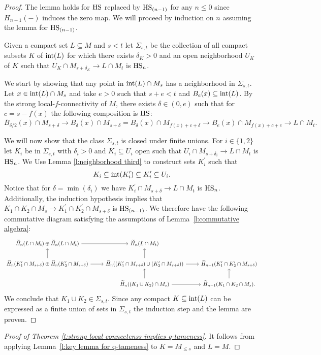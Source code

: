 \begin{proof}
	The lemma holds for $\mathrm{HS}$ replaced by $\mathrm{HS}_{(n-1)}$ for any $n \leq 0$ since $H_{n-1}(-)$ induces the zero map. We will proceed by induction on $n$ assuming the lemma for $\mathrm{HS}_{(n-1)}$. 
	
	Given a compact set $L \subseteq M$ and $s < t$ let $\Sigma_{s, t}$ be the collection of all compact subsets $K$ of $\operatorname{int}(L)$ for which there exists $\delta_K > 0$ and an open neighborhood $U_K$ of $K$ such that $U_K \cap M_{s+\delta_K} \to L \cap M_{t}$ is $\mathrm{HS}_n$.
	
	We start by showing that any point in $\operatorname{int}(L) \cap M_s$ has a neighborhood in $\Sigma_{s, t}$.
	Let $x \in \operatorname{int}(L) \cap M_{s}$ and take $e > 0$ such that $s + e < t$ and $B_e(x) \subseteq \operatorname{int}(L)$.
	By the strong local-$f$-connectivity of $M$, there exists $\delta \in (0, e)$ such that for $c = s - f(x)$ the following composition is $\mathrm{HS}$:
	\begin{equation*}
	\overline B_{\delta/2}(x) \cap M_{s + \delta} \to
	B_\delta(x) \cap M_{s + \delta} =
	B_\delta(x) \cap M_{f(x) + c + \delta} \to
	B_e(x) \cap M_{f(x) + c + e} \to
	L \cap M_{t}.
	\end{equation*}  
	
	We will now show that the class $\Sigma_{s,t}$ is closed under finite unions.
	For $i \in \{1, 2\}$ let $K_i$ be in $\Sigma_{s,t}$ with $\delta_i > 0$ and $K_i \subseteq U_i$ open such that $U_{i} \cap M_{s+\delta_i} \to L \cap M_{t}$ is $\mathrm{HS}_n$.
	We Use Lemma \ref{l:neighborhood third} to construct sets $K_i^\prime$ such that
	\begin{equation*}
	K_i \subseteq \operatorname{int}(K_i^\prime) \subseteq K_i^\prime \subseteq U_i.
	\end{equation*}
	Notice that for $\delta = \min(\delta_i)$ we have $K_i^\prime \cap M_{s+\delta} \to L \cap M_t$ is $\mathrm{HS}_n$.
	Additionally, the induction hypothesis implies that $K_1 \cap K_2 \cap M_s \to K_1^\prime \cap K_2^\prime \cap M_{s+\delta}$ is $\mathrm{HS}_{(n-1)}$.
	We therefore have the following commutative diagram satisfying the assumptions of Lemma~\ref{l:commutative algebra}:
	\begin{equation*}
	\begin{tikzcd}
	\H_n(L \cap M_t) \oplus \H_n(L \cap M_t) \arrow[r] &
	\H_n(L \cap M_t) & \\
	\H_{n}(K_1^\prime \cap M_{s+\delta}) \oplus \H_n(K_2^\prime \cap M_{s+\delta}) \arrow[r] \arrow[u] & 
	\H_{n}((K_1^\prime \cap M_{s+\delta}) \cup (K_2^\prime \cap M_{s+\delta})) \arrow[r] \arrow[u] &
	\H_{n-1}(K_1^\prime \cap K_2^\prime \cap M_{s+\delta}) \\ & 
	\H_{n}((K_1 \cup K_2) \cap M_s) \arrow[r] \arrow[u] &
	\H_{n-1}(K_1 \cap K_2 \cap M_s). \arrow[u]
	\end{tikzcd}
	\end{equation*}
	We conclude that $K_1 \cup K_2 \in \Sigma_{s, t}$.
	Since any compact $K \subseteq \operatorname{int}(L)$ can be expressed as a finite union of sets in $\Sigma_{s,t}$ the induction step and the lemma are proven.
\end{proof}

\begin{proof}[Proof of Theorem \ref{t:strong local connectenss implies q-tameness}]
	It follows from applying Lemma~\ref{l:key lemma for q-tameness} to $K = M_{\leq s}$ and $L = M$.
\end{proof}